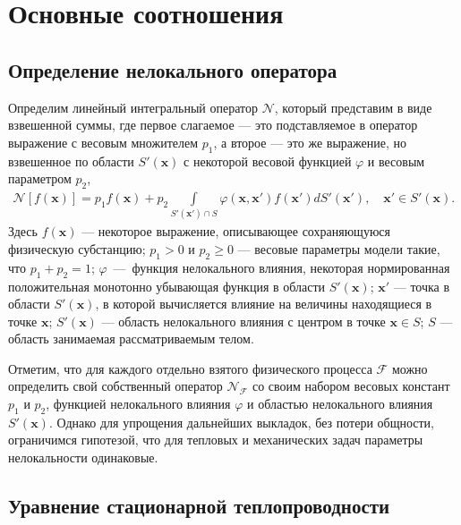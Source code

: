 \chapter{Основные соотношения}\label{ch:BasicRelations} 

\section{Определение нелокального оператора}\label{sec:BasicRelations/NonlocalOperator}

Определим линейный интегральный оператор $\mathcal{N}$, который представим в виде взвешенной суммы, где первое слагаемое --- это подставляемое в оператор выражение с весовым множителем $p_1$, а второе --- это же выражение, но взвешенное по области $S'(\boldsymbol{x})$ с некоторой весовой функцией $\varphi$ и весовым параметром $p_2$,
\begin{gather}
	\label{eq:IntegroDiffOperator}
	\mathcal{N} [f(\boldsymbol{x})] = 
	p_1 f(\boldsymbol{x}) + 
	p_2 \int\limits_{S'(\boldsymbol{x}') \cap S} 
		\varphi(\boldsymbol{x}, \boldsymbol{x}') f(\boldsymbol{x}')
	dS'(\boldsymbol{x}'),
	\quad
	\boldsymbol{x}' \in S'(\boldsymbol{x}).
\end{gather}
Здесь $f(\boldsymbol{x})$ --- некоторое выражение, описывающее сохраняющуюся физическую субстанцию;
$p_1 > 0$ и $p_2 \geqslant 0$ --- весовые параметры модели такие, что $p_1 + p_2 = 1$;
$\varphi$~---~функция нелокального влияния, некоторая нормированная положительная монотонно убывающая функция в области $S'(\boldsymbol{x})$; 
$\boldsymbol{x}'$ --- точка в области $S'(\boldsymbol{x})$, в которой вычисляется влияние на величины находящиеся в точке $\boldsymbol{x}$;
$S'(\boldsymbol{x})$ --- область нелокального влияния с центром в точке $\boldsymbol{x} \in S$;
$S$ --- область занимаемая рассматриваемым телом.

Отметим, что для каждого отдельно взятого физического процесса $\mathcal{F}$ можно определить свой собственный оператор $\mathcal{N}_\mathcal{F}$ со своим набором весовых констант $p_1$ и $p_2$, функцией нелокального влияния $\varphi$ и областью нелокального влияния $S'(\boldsymbol{x})$. Однако для упрощения дальнейших выкладок, без потери общности, ограничимся гипотезой, что для тепловых и механических задач параметры нелокальности одинаковые.

\section{Уравнение стационарной теплопроводности}\label{sec:BasicRelations/HeatEquation}

